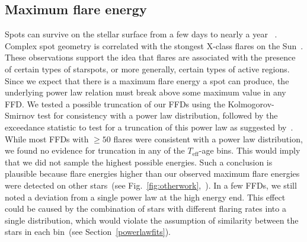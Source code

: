 \documentclass{aa}
\begin{document}
\subsection{Maximum flare energy}
\label{sec:sec:maxen}
Spots can survive on the stellar surface from a few days to nearly a year~
\citep{namekata_solarstellarwlf_2017, davenport_flaresandspots_2015}. Complex spot geometry is correlated with the stongest X-class flares on the Sun~\citep{toriumi_flaresspotssun_2017, sammis_deltaspotsflares_2000}. These observations support the idea that flares are associated with the presence of certain types of starspots, or more generally, certain types of active regions. Since we expect that there is a maximum flare energy a spot can produce, the underlying power law relation must break above some maximum value in any FFD. We tested a possible truncation of our FFDs using the Kolmogorov-Smirnov test for consistency with a power law distribution, followed by the exceedance statistic to test for a truncation of this power law as suggested by~\citet{maschberger2009}. While most FFDs with $\geqslant50$ flares were consistent with a power law distribution, we found no evidence for truncation in any of the $T_\mathrm{eff}$-age bins. This would imply that we did not sample the highest possible energies. Such a conclusion is plausible because flare energies higher than our observed maximum flare energies were detected on other stars~(see Fig.~\ref{fig:otherwork},~\citealt{howard2019, lin2019, shibayama2013}). In a few FFDs, we still noted a deviation from a single power law at the high energy end. This effect could be caused by the combination of stars with different flaring rates into a single distribution, which would violate the assumption of similarity between the stars in each bin~(see Section~\ref{powerlawfits}).
\end{document}
